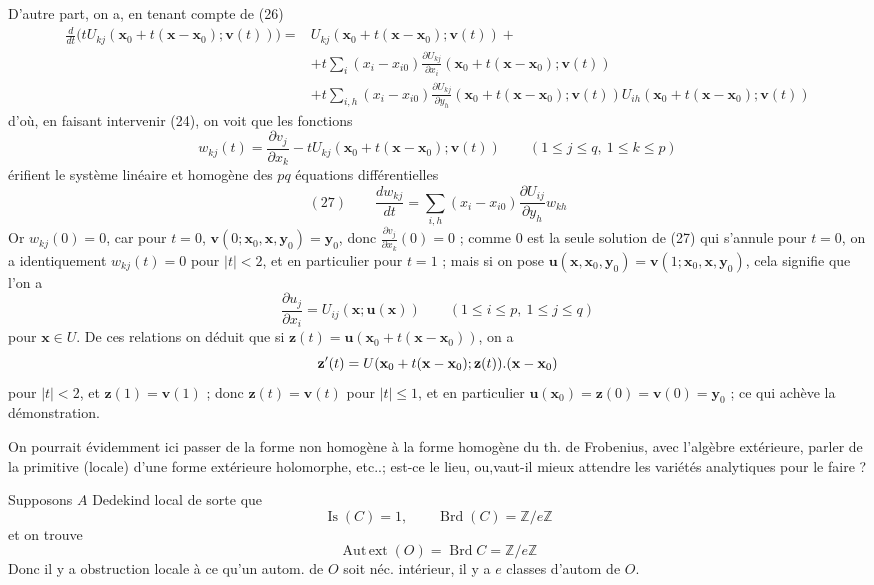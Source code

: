 D'autre part, on a, en tenant compte de (26)
\[
\begin{aligned}
\frac d{dt}\bigl(tU_{kj}(\mathbf{x}_0+t(\mathbf{x}-\mathbf{x}_0);\mathbf{v}(t))\bigr)
={}&U_{kj}(\mathbf{x}_0+t(\mathbf{x}-\mathbf{x}_0);\mathbf{v}(t))+\\
&+t\sum_i(x_i-x_{i0})\frac{\partial U_{kj}}{\partial x_i}
(\mathbf{x}_0+t(\mathbf{x}-\mathbf{x}_0);\mathbf{v}(t))\\
&+t\sum_{i,h}(x_i-x_{i0})\frac{\partial U_{kj}}{\partial y_h}
(\mathbf{x}_0+t(\mathbf{x}-\mathbf{x}_0);\mathbf{v}(t))U_{ih}(\mathbf{x}_0+t(\mathbf{x}-\mathbf{x}_0);\mathbf{v}(t))
\end{aligned}
\]
d'où, en faisant intervenir (24), on voit que les fonctions
\[
w_{kj}(t)=\frac{\partial v_j}{\partial x_k}
-tU_{kj}(\mathbf{x}_0+t(\mathbf{x}-\mathbf{x}_0);\mathbf{v}(t))
\qquad(1\leq j\leq q,\ 1\leq k\leq p)
\]
érifient le système linéaire et homogène des $pq$ équations différentielles
\[
(27)\qquad
\frac{dw_{kj}}{dt}=\sum_{i,h}(x_i-x_{i0})\frac{\partial U_{ij}}{\partial y_h}w_{kh}
\]
Or $w_{kj}(0)=0$, car pour $t=0$, $\mathbf{v}(0;\mathbf{x}_0,\mathbf{x},\mathbf{y}_0)=\mathbf{y}_0$, donc $\frac{\partial v_j}{\partial x_k}(0)=0$ ;
comme $0$ est la seule solution de (27) qui s'annule pour $t=0$, on a identiquement $w_{kj}(t)=0$ pour $|t|<2$, et en particulier pour $t=1$ ;
mais si on pose $\mathbf{u}(\mathbf{x},\mathbf{x}_0,\mathbf{y}_0)=\mathbf{v}(1;\mathbf{x}_0,\mathbf{x},\mathbf{y}_0)$, cela signifie que l'on a
\[
\frac{\partial u_j}{\partial x_i}=U_{ij}(\mathbf{x};\mathbf{u}(\mathbf{x}))
\qquad(1\leq i\leq p,\ 1\leq j\leq q)
\]
pour $\mathbf{x}\in U$. De ces relations on déduit que si $\mathbf{z}(t)=\mathbf{u}(\mathbf{x}_0+t(\mathbf{x}-\mathbf{x}_0))$, on a
\[
\mathbf{z}'(t)=U(\mathbf{x}_0+t(\mathbf{x}-\mathbf{x}_0);\mathbf{z}(t)).(\mathbf{x}-\mathbf{x}_0)
\]
pour $|t|<2$, et $\mathbf{z}(1)=\mathbf{v}(1)$ ; donc $\mathbf{z}(t)=\mathbf{v}(t)$ pour $|t|\leq1$, et en particulier $\mathbf{u}(\mathbf{x}_0)=\mathbf{z}(0)=\mathbf{v}(0)=\mathbf{y}_0$ ; ce qui achève la démonstration.

On pourrait évidemment ici passer de la forme non homogène à la forme homogène du th. de Frobenius, avec l'algèbre extérieure, parler de la primitive (locale) d'une forme extérieure holomorphe, etc..; est-ce le lieu, ou,vaut-il mieux attendre les variétés analytiques pour le faire ?


Supposons $A$  Dedekind  local
 de sorte que
\[
\operatorname{Is}(C)=1,\qquad\operatorname{Brd}(C)=\mathbb Z/e\mathbb Z
\]
et on trouve
\[
\operatorname{Aut\,ext}(O)=\operatorname{Brd}C=\mathbb Z/e\mathbb Z
\]
Donc il y a obstruction locale à ce qu'un autom. de $O$ soit néc. intérieur, il y a $e$ classes d'autom de $O$.

